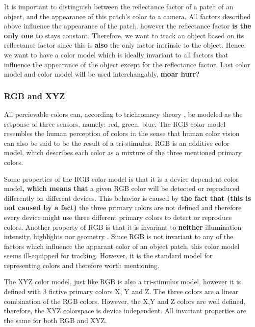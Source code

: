 \documentclass[a4paper,11pt]{article}
\begin{document}
It is important to distinguish between the reflectance factor of a patch of an object, and the appearance of this patch's color to a camera. All factors described above influence the appearance of the patch, however the reflectance factor \textbf{is the only one to} stays constant. Therefore, we want to track an object based on its reflectance factor since this is \textbf{also} the only factor intrinsic to the object.  Hence, we want to have a color model which is ideally invariant to all factors that influence the appearance of the object except for the reflectance factor.  Last color model and color model will be used interchangably, \textbf{moar hurr?}

\subsubsection{RGB and XYZ}
		
All percievable colors can, according to trichromacy theory \cite{gevers_color}, be modeled as the response of three sensors, namely: red, green, blue. The RGB color model resembles the human perception of colors in the sense that human color vision can also be said to be the result of a tri-stimulus.  RGB is an additive color model, which describes each color as a mixture of the three mentioned primary colors.

Some properties of the RGB color model is that it is a device dependent color model\textbf{, which means that} a given RGB color will be detected or reproduced differently on different devices. This behavior is caused by \textbf{the fact that (this is not caused by a fact)} the three primary colors are not defined and therefore every device might use three different primary colors to detect or reproduce colors. Another property of RGB is that it is invariant to \textbf{neither} illumination intensity, highlights nor geometry \cite{gevers_invariant}. Since RGB is not invariant to any of the factors which influence the apparant color of an object patch, this color model seems ill-equipped for tracking. However, it is the standard model for representing colors and therefore worth mentioning.

The XYZ color model, just like RGB is also a tri-stimulus model, however it is defined  with 3 fictive primary colors X, Y and Z. The three colors are a linear combination of the RGB colors. However, the X,Y and Z colors are well defined, therefore, the XYZ colorspace is device independent. All invariant properties are the same for both RGB and XYZ.
\end{document}
